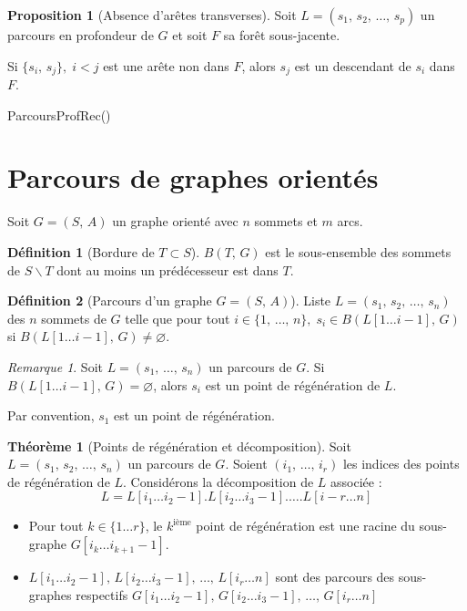 \documentclass[11pt,english,french]{scrreprt}
\theoremstyle{remark}
\newtheorem*{rem*}{Remarque}
\theoremstyle{definition}
\newtheorem*{def*}{Définition}
\newtheorem*{prop*}{Proposition}
\newtheorem*{thm*}{Théorème}
\begin{document}
\begin{prop*}[Absence d'arêtes transverses]
	Soit $L=(s_1,\,s_2,\,\dots,\,s_p)$ un parcours en profondeur de $G$ et soit $F$ sa forêt sous-jacente.
	
	Si $\{s_i,\,s_j\},\; i < j$ est une arête non dans $F$, alors $s_j$ est un descendant de $s_i$ dans $F$.
\end{prop*}

\begin{procedure} 
	\DontPrintSemicolon 
	\caption{ParcoursProfRec()} 
\end{procedure}

\section{Parcours de graphes orientés} %

Soit $G=(S,\,A)$ un graphe orienté avec $n$ sommets et $m$ arcs.

\begin{def*}[Bordure de $T\subset S$]
	$B(T,\,G)$ est le sous-ensemble des sommets de $S\backslash T$ dont au moins un prédécesseur est dans $T$.
\end{def*}

\begin{def*}[Parcours d'un graphe $G=(S,\,A)$]
	Liste $L=(s_1,\,s_2,\,\dots,\,s_n)$ des $n$ sommets de $G$ telle que pour tout $i\in\{1,\,\dots,\,n\},\; s_i\in B(L[1\dots i-1],\,G)$ si $B(L[1\dots i-1],\,G)\neq \varnothing$.
\end{def*}

\begin{rem*}
	Soit $L=(s_1,\,\dots,\,s_n)$ un parcours de $G$. Si $B(L[1\dots i-1],\,G)=\varnothing$, alors $s_i$ est un point de régénération de $L$.
	
	Par convention, $s_1$ est un point de régénération.
\end{rem*}

\begin{thm*}[Points de régénération et décomposition]
	Soit $L=(s_1,\,s_2,\,\dots,\,s_n)$ un parcours de $G$. Soient $(i_1,\,\dots,\,i_r)$ les indices des points de régénération de $L$. Considérons la décomposition de $L$ associée :
	\[
		L=L[i_1\dots i_2-1].L[i_2\dots i_3-1].\dots.L[i-r\dots n]
	\]
	\begin{itemize}
		\item Pour tout $k\in\{1\dots r\}$, le $k^{\mathrm{ième}}$ point de régénération est une racine du sous-graphe $G[i_k\dots i_{k+1}-1]$.
		\item $L[i_1\dots i_2-1],\,L[i_2\dots i_3-1],\,\dots,\,L[i_r\dots n]$ sont des parcours des sous-graphes respectifs $G[i_1\dots i_2-1],\,G[i_2\dots i_3-1],\,\dots,\,G[i_r\dots n]$
	\end{itemize}
\end{thm*}
\end{document}
